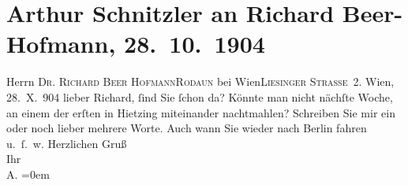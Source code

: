 

         
         \renewcommand{\erwaehntePersonen}{Personen: Richard Beer-Hofmann}
         \renewcommand{\erwaehnteOrte}{Orte: Berlin, Liesingerstraße, Rodaun, Wien, XIII., Hietzing}
         \renewcommand{\erwaehnteWerke}{}
               \section[Arthur Schnitzler an Richard Beer-Hofmann, 28. 10. 1904]{ Arthur Schnitzler an Richard Beer-Hofmann, 28. 10. 1904}\nopagebreak{}\rehead{ }\begin{ledgroupsized}[t]{13cm}\normalsize\beginnumbering \toendnotes[C]{\smallbreak\pagebreak[2]} 
\toendnotes[C]{\smallbreak}\pstart{}{\pb}Herrn \textsc{Dr. Richard Beer
                     Hofmann}\pend{}\pstart{}\textsc{Rodaun} bei Wien\pend{}\pstart{}\textsc{Liesinger Straße 2.}\pend{}{\bigskip}\pstart
           \raggedleft{}{\pb}Wien, 28. X. 904\pend
           \pstart
           lieber Richard, ſind Sie ſchon da? Könnte man nicht nächſte Woche,
               an einem der erſten \label{K_L01461-1v}\label{K_L01461-1h} in Hietzing miteinander nachtmahlen?
               Schreiben Sie mir ein oder noch lieber mehrere Worte. Auch wann Sie wieder nach Berlin fahren u. ſ. w.\pend
           \pstart
           Herzlichen Gruß{\\[\baselineskip]}Ihr{\\[\baselineskip]}\spacefill\mbox{A.}\pend
           \leftskip=0em{}
         
         \endnumbering{}\end{ledgroupsized}  \newcommand{\dateiname}{L01461}\newcommand{\titel}{Arthur Schnitzler an Richard Beer-Hofmann, 28. 10. 1904}\newcommand{\editorInnen}{Martin Anton Müller und Gerd-Hermann Susen}
      